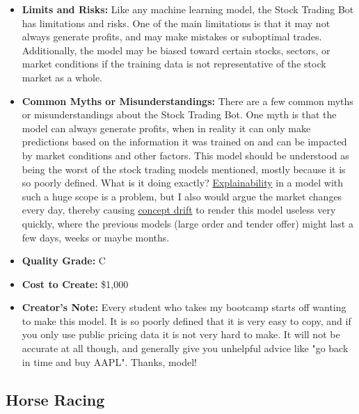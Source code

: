 \begin{itemize}
\begin{enumerate}
        \end{enumerate}
    \item \textbf{Limits and Risks:} Like any machine learning model, the Stock Trading Bot has limitations and risks. One of the main limitations is that it may not always generate profits, and may make mistakes or suboptimal trades. Additionally, the model may be biased toward certain stocks, sectors, or market conditions if the training data is not representative of the stock market as a whole.
    \item \textbf{Common Myths or Misunderstandings:} There are a few common myths or misunderstandings about the Stock Trading Bot. One myth is that the model can always generate profits, when in reality it can only make predictions based on the information it was trained on and can be impacted by market conditions and other factors. This model should be understood as being the worst of the stock trading models mentioned, mostly because it is so poorly defined. What is it doing exactly? \hyperref[sec:explain]{Explainability} in a model with such a huge scope is a problem, but I also would argue the market changes every day, thereby causing \hyperref[sec:drift]{concept drift} to render this model useless very quickly, where the previous models (large order and tender offer) might last a few days, weeks or maybe months.
    \item \textbf{Quality Grade:} C
    \item \textbf{Cost to Create:} \$1,000
    \item \textbf{Creator's Note:} Every student who takes my bootcamp starts off wanting to make this model. It is so poorly defined that it is very easy to copy, and if you only use public pricing data it is not very hard to make. It will not be accurate at all though, and generally give you unhelpful advice like "go back in time and buy AAPL". Thanks, model! 
\end{itemize}

\subsection{Horse Racing}

